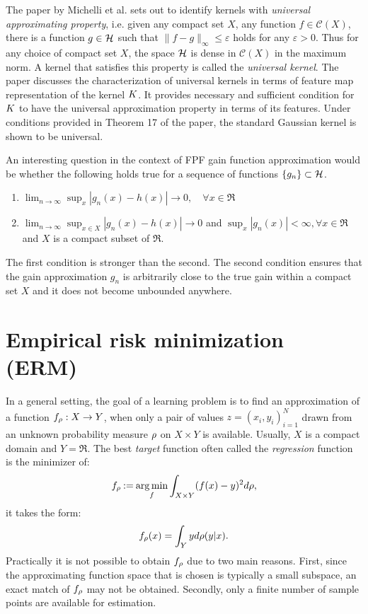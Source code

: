 The paper by Michelli et al. \cite{micchaxuzha06} sets out to identify kernels with \textit{universal approximating property}, i.e. given any compact set $X$, any function $f \in \mathcal{C}(X)$, there is a function $g \in {\cal H}$ such that $\| f - g\|_{\infty} \leq \varepsilon$ holds for any $\varepsilon > 0$. Thus for any choice of compact set $X$, the space ${\cal H}$ is dense in $\mathcal{C}(X)$ in the maximum norm. A kernel that satisfies this property is called the \textit{universal kernel}. The paper discusses the characterization of universal kernels in terms of feature map representation of the kernel $K$. It provides necessary and sufficient condition for $K$ to have the universal approximation property in terms of its features. Under conditions provided in Theorem 17 of the paper, the standard Gaussian kernel is shown to be universal. 


An interesting question in the context of FPF gain function approximation would be whether the following holds true for a sequence of functions $\{g_n\} \subset {\cal H}$.
\begin{enumerate}
\item $\lim_{n \to \infty} \sup_x |g_n(x) -h(x) | \to 0,\quad \forall x \in \Re$
\item $ \lim_{n \to \infty}\sup_{x \in X} |g_n(x) - h(x) | \to 0$ and $\sup_x |g_n(x)| < \infty,  \forall x \in \Re$ and $X$ is a compact subset of $\Re$. 
\end{enumerate}
The first condition is stronger than the second. The second condition ensures that the gain approximation $g_n$ is arbitrarily close to the true gain within a compact set $X$ and it does not become unbounded anywhere. 


\section{Empirical risk minimization (ERM)}
\label{s:erm}

In a general setting, the goal of a learning problem is to find an approximation of a function $f_\rho : X \to Y$, when only a pair of values $z = (x_i, y_i)_{i=1}^N$ drawn from an unknown probability measure $\rho$ on $X \times Y$ is available. Usually, $X$ is a compact domain and $Y = \Re$. The best \textit{target} function often called the \textit{regression} function is the minimizer of:
\[
f_\rho \mathbin{:=} \mathop{\rm arg{\,}min}_f \int_{X \times Y} (f(x) - y) ^2 d\rho,
\]
it takes the form:
\begin{equation}
f_\pr(x) = \int_Y y d\pr(y|x).
\label{eq:f_rho}
\end{equation}
Practically it is not possible to obtain $f_\rho$ due to two main reasons. First, since the approximating function space that is chosen is typically a small subspace, an exact match of $f_\rho$ may not be obtained. Secondly, only a finite number of sample points are available for estimation.


